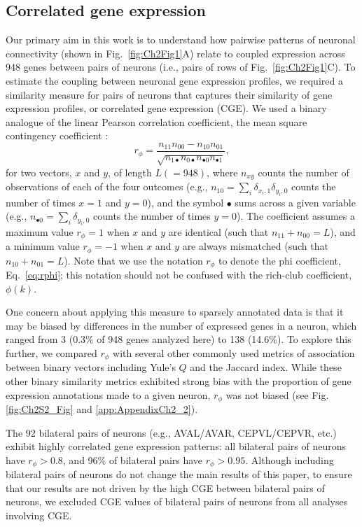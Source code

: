 \subsection*{Correlated gene expression}
Our primary aim in this work is to understand how pairwise patterns of neuronal connectivity (shown in Fig.~\ref{fig:Ch2Fig1}A) relate to coupled expression across 948 genes between pairs of neurons (i.e., pairs of rows of Fig.~\ref{fig:Ch2Fig1}C).
To estimate the coupling between neuronal gene expression profiles, we required a similarity measure for pairs of neurons that captures their similarity of gene expression profiles, or correlated gene expression (CGE).
We used a binary analogue of the linear Pearson correlation coefficient, the mean square contingency coefficient \citep{Warrens2008}:
\begin{equation} \label{eq:rphi}
    r_\phi = \frac{n_{11}n_{00} - n_{10}n_{01}}{\sqrt{n_{1\bullet}n_{0\bullet}n_{\bullet 0}n_{\bullet 1}}},
\end{equation}
for two vectors, $x$ and $y$, of length $L (=948)$, where $n_{xy}$ counts the number of observations of each of the four outcomes (e.g., $n_{10} = \sum_i \delta_{x_i,1}\delta_{y_i,0}$ counts the number of times $x=1$ and $y=0$), and the symbol $\bullet$ sums across a given variable (e.g., $n_{\bullet 0} = \sum_i \delta_{y_i,0}$ counts the number of times $y = 0$).
The coefficient assumes a maximum value $r_\phi = 1$ when $x$ and $y$ are identical (such that $n_{11} + n_{00} = L$), and a minimum value $r_\phi = -1$ when $x$ and $y$ are always mismatched (such that $n_{10} + n_{01} = L$).
Note that we use the notation $r_\phi$ to denote the phi coefficient, Eq.~\eqref{eq:rphi}; this notation should not be confused with the rich-club coefficient, $\phi(k)$.

One concern about applying this measure to sparsely annotated data is that it may be biased by differences in the number of expressed genes in a neuron, which ranged from 3 (0.3\% of 948 genes analyzed here) to 138 (14.6\%).
To explore this further, we compared $r_\phi$ with several other commonly used metrics of association between binary vectors including Yule's $Q$ and the Jaccard index.
While these other binary similarity metrics exhibited strong bias with the proportion of gene expression annotations made to a given neuron, $r_\phi$ was not biased (see Fig. \ref{fig:Ch2S2_Fig} and \ref{app:AppendixCh2_2}).

The 92 bilateral pairs of neurons (e.g., AVAL/AVAR, CEPVL/CEPVR, etc.) exhibit highly correlated gene expression patterns: all bilateral pairs of neurons have $r_\phi > 0.8$, and 96\% of bilateral pairs have $r_\phi > 0.95$.
Although including bilateral pairs of neurons do not change the main results of this paper, to ensure that our results are not driven by the high CGE between bilateral pairs of neurons, we excluded CGE values of bilateral pairs of neurons from all analyses involving CGE.

